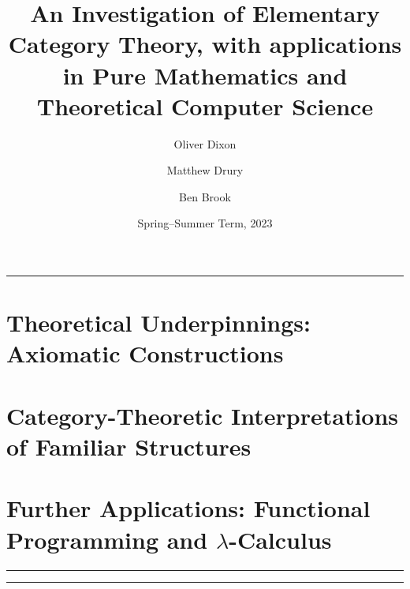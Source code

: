 \documentclass[10pt,a4paper]{amsart}
\title[An Investigation of Elementary Category Theory]{An Investigation of %
        Elementary Category Theory, with applications in Pure Mathematics and %
        Theoretical Computer Science}
\author{Oliver Dixon}  \email{\yorkemail{od641}}
\author{Matthew Drury} \email{\yorkemail{md1499}}
\author{Ben Brook}     \email{\yorkemail{bb1170}}
\date{Spring--Summer Term, 2023}
\begin{document}
%
\begin{abstract}
        \lipsum[1-1]
\end{abstract}
\maketitle
\tableofcontents
\par\vspace{-2em}\noindent\rule{\textwidth}{0.4pt}\vspace{1em}
\section{Theoretical %
        Underpinnings: Axiomatic Constructions}
\lipsum[2-4]

\section{Category-Theoretic %
        Interpretations of Familiar Structures}
\lipsum[4-6]

\section{Further Applications: %
        Functional Programming and \texorpdfstring{$\lambda$}{Lambda}-Calculus}
\lipsum[6-8]
%
\par\vspace{1.8em}\noindent\rule{\textwidth}{0.4pt}\vspace{1.5em}
\printbibliography[title=Cited Works and Tangential Literature]
\par\vspace{1.8em}\noindent\rule{\textwidth}{0.4pt}
%
\end{document}

